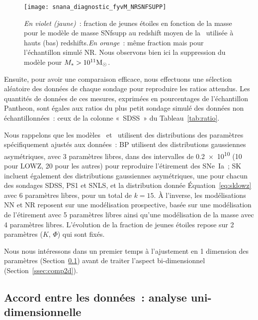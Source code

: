 \documentclass[../main/main.tex]{subfiles}
\begin{document}
\begin{SCfigure}[1][h!]
    \centering
    \texttt{[image: snana\_diagnostic\_fyvM\_NRSNFSUPP]}
    \caption[Fraction de jeunes étoiles en fonction de la masse pour le modèle
    de masse SNfsupp]{\textit{En violet (jaune)}~: fraction de jeunes étoiles en
        fonction de la masse pour le modèle de masse SNfsupp au redshift moyen
        de la \hostlib\ utilisée à hauts (bas) redshifts.\smallbreak \textit{En
        orange}~: même fraction mais pour l'échantillon simulé NR. Nous
        observons bien ici la suppression du modèle pour
    $M_* > 10^{11}\si{\Msun}$.}
    \label{fig:fyvMsupp}
\end{SCfigure}

Ensuite, pour avoir une comparaison efficace, nous effectuons une sélection
aléatoire des données de chaque sondage pour reproduire les ratios attendus. Les
quantités de données de ces mesures, exprimées en pourcentages de l'échantillon
Pantheon, sont égales aux ratios du plus petit sondage simulé des données non
échantillonnées~: ceux de la colonne «~SDSS~» du Tableau~\ref{tab:ratio}.

Nous rappelons que les modèles~
et~ utilisent des distributions des paramètres
spécifiquement ajustés aux données~: BP utilisent des distributions gaussiennes
asymétriques, avec 3 paramètres libres, dans des intervalles de
\SI{0.2e10}{\Msun} (10 pour LOWZ, 20 pour les autres) pour reproduire
l'étirement des SNe~Ia~; SK incluent également des distributions gaussiennes
asymétriques, une pour chacun des sondages SDSS, PS1 et SNLS, et la distribution
donnée Équation~\ref{eq:sklowz} avec 6 paramètres libres, pour un total de $k =
15$. À l'inverse, les modélisations NN et NR reposent sur une modélisation
prospective, basée sur une modélisation de l'étirement avec 5 paramètres libres
ainsi qu'une modélisation de la masse avec 4 paramètres libres. L'évolution de
la fraction de jeunes étoiles repose sur 2 paramètres ($K$, $\Phi$) qui sont
fixés.

Nous nous intéressons dans un premier temps à l'ajustement en 1 dimension des
paramètres (Section~\ref{ssec:comp1d}) avant de traiter l'aspect bi-dimensionnel
(Section~\ref{ssec:comp2d}).

\subsection{Accord entre les données~: analyse uni-dimensionnelle}\label{ssec:comp1d}
\end{document}

